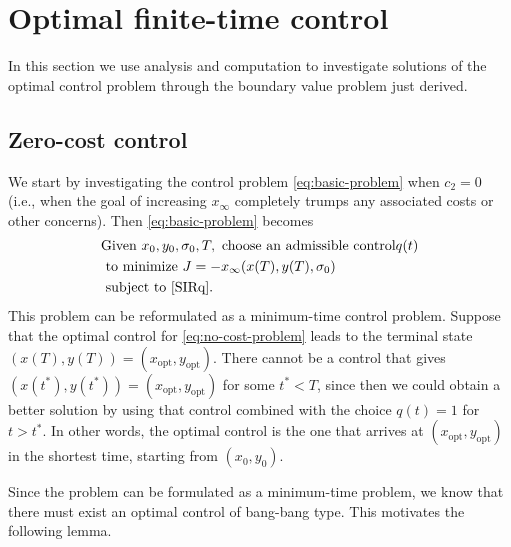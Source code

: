 \documentclass[english,12pt,letter]{article}
\newcommand{\xopt}{x_\text{opt}}
\newcommand{\yopt}{y_\text{opt}}
\begin{document}
\section{Optimal finite-time control\label{sec:analytic}}
In this section we use analysis and computation to investigate solutions of the
optimal control problem through the boundary value problem just derived.

\subsection{Zero-cost control}
We start by investigating the control problem \eqref{eq:basic-problem} when $c_2=0$
(i.e., when the goal of increasing $x_\infty$ completely
trumps any associated costs or other concerns).  Then \eqref{eq:basic-problem} becomes
\begin{align} \label{eq:no-cost-problem}
\begin{aligned}
& \text{Given } x_0, y_0, \sigma_0, T, \text{ choose an admissible control} q(t) \\
& \text{ to minimize }  J = -x_\infty(x(T),y(T),\sigma_0) \\
& \text{ subject to } \eqref{SIRq}.
\end{aligned}
\end{align}
This problem can be reformulated as a minimum-time control problem.  Suppose
that the optimal control for \eqref{eq:no-cost-problem} leads to the terminal
state $(x(T),y(T)) = (\xopt,\yopt)$.  There cannot be a
control that gives $(x(t^*),y(t^*)) = (\xopt,\yopt)$ for some $t^*<T$, since then
we could obtain a better solution by using that control combined with the choice
$q(t)=1$ for $t>t^*$.  In other words,
the optimal control is the one that arrives at $(\xopt,\yopt)$ in the shortest time,
starting from $(x_0,y_0)$.

Since the problem can be formulated as a minimum-time problem, we know that
there must exist an optimal control of bang-bang type.  This motivates the
following lemma.
\end{document}
